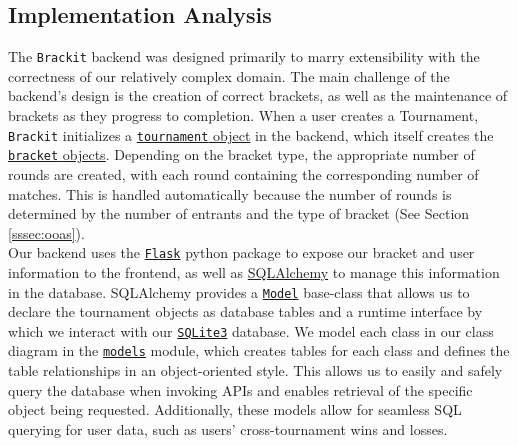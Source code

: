 \documentclass{article}
\begin{document}
\subsection{Implementation Analysis}


    The \texttt{Brackit} backend was designed primarily to marry extensibility with the correctness of 
our relatively complex domain. The main challenge of the backend's design is the creation of 
correct brackets, as well as the maintenance of brackets as they progress to completion.
When a user creates a Tournament, \texttt{Brackit} initializes a \href{https://github.com/alextrosta/brackit/blob/master/backend/tournament.py#L18}{\texttt{tournament} object} in the backend, which itself creates
the \href{https://github.com/alextrosta/brackit/blob/master/backend/tournament.py#L59}{\texttt{bracket} objects}. Depending on the bracket type, the appropriate number of rounds are created, 
with each round containing the corresponding number of matches. This is handled automatically because
the number of rounds is determined by the number of entrants and the type of bracket (See Section \ref{sssec:ooas}).\\
Our backend uses the \href{https://flask.palletsprojects.com/en/1.1.x/}{\texttt{Flask}} python package to expose our bracket and user information to 
the frontend, as well as \href{https://www.sqlalchemy.org/}{SQLAlchemy} to manage this information in the database. SQLAlchemy provides a \href{https://flask-sqlalchemy.palletsprojects.com/en/2.x/models/}{\texttt{Model}} base-class that allows us to declare the tournament objects as database tables and a runtime interface by which we interact with our \href{https://www.sqlite.org/index.html}{\texttt{SQLite3}} database. We model each class in our class diagram in the \href{https://github.com/alextrosta/brackit/blob/master/backend/app/models.py}{\texttt{models}} module, which creates 
tables for each class and defines the table relationships in an object-oriented style. This 
allows us to easily and safely query the database when invoking APIs and enables 
retrieval of the specific object being requested. Additionally, these models allow for 
seamless SQL querying for user data, such as users' cross-tournament wins and losses. 
\end{document}
